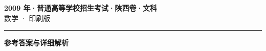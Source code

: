 \documentclass[zihao=5, a4paper]{ctexart}
\begin{document}
\begin{center}
  {\Large\bfseries 2009 年·普通高等学校招生考试·陕西卷·文科}\\[4pt]
  {\large 数学 · 印刷版}
\end{center}
\medskip
{}

\par\bigskip\hrule\bigskip
{}
\begin{center}{\large\bfseries 参考答案与详细解析}\end{center}
\smallskip

\end{document}
